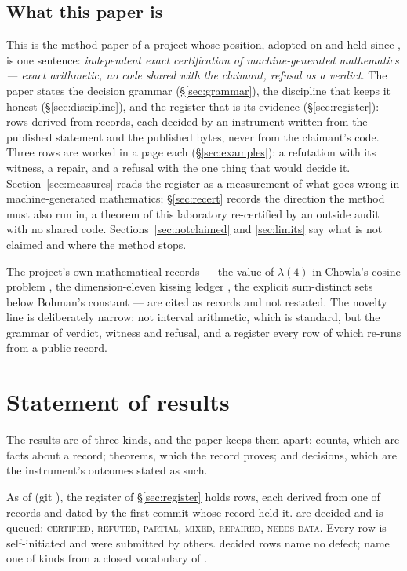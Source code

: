 \documentclass[11pt]{article}
\theoremstyle{plain}
\theoremstyle{definition}
\begin{document}
\subsection{What this paper is}

This is the method paper of a project whose position, adopted on \PosDate{} and held since \cite{Positioning}, is one sentence: \emph{independent exact certification of machine-generated mathematics --- exact arithmetic, no code shared with the claimant, refusal as a verdict.} The paper states the decision grammar (\S\ref{sec:grammar}), the discipline that keeps it honest (\S\ref{sec:discipline}), and the register that is its evidence (\S\ref{sec:register}): \RegRows{} rows derived from \RegSources{} records, each decided by an instrument written from the published statement and the published bytes, never from the claimant's code. Three rows are worked in a page each (\S\ref{sec:examples}): a refutation with its witness, a repair, and a refusal with the one thing that would decide it. Section~\ref{sec:measures} reads the register as a measurement of what goes wrong in machine-generated mathematics; \S\ref{sec:recert} records the direction the method must also run in, a theorem of this laboratory re-certified by an outside audit with no shared code. Sections~\ref{sec:notclaimed} and \ref{sec:limits} say what is not claimed and where the method stops.

The project's own mathematical records --- the value of $\lambda(4)$ in Chowla's cosine problem \cite{Lambda4}, the dimension-eleven kissing ledger \cite{Kissing}, the explicit sum-distinct sets below Bohman's constant \cite{Erdos1} --- are cited as records and not restated. The novelty line is deliberately narrow: not interval arithmetic, which is standard, but the grammar of verdict, witness and refusal, and a register every row of which re-runs from a public record.

\section{Statement of results}\label{sec:results}

The results are of three kinds, and the paper keeps them apart: counts, which are facts about a record; theorems, which the record proves; and decisions, which are the instrument's outcomes stated as such.

\begin{proposition}\label{prop:register}
As of \RegDate{} (git \RegGit{}), the register of \S\ref{sec:register} holds \RegRows{} rows, each derived from one of \RegSources{} records and dated by the first commit whose record held it. \RegDecided{} are decided and \RegPending{} is queued: \VCertified{} \textsc{certified}, \VRefuted{} \textsc{refuted}, \VPartial{} \textsc{partial}, \VMixed{} \textsc{mixed}, \VRepaired{} \textsc{repaired}, \VNeedsData{} \textsc{needs data}. Every row is self-initiated and \RegSubmitted{} were submitted by others. \RegHolds{} decided rows name no defect; \RegDefects{} name one of \RegKindsUsed{} kinds from a closed vocabulary of \RegKinds{}.
\end{proposition}
\end{document}
